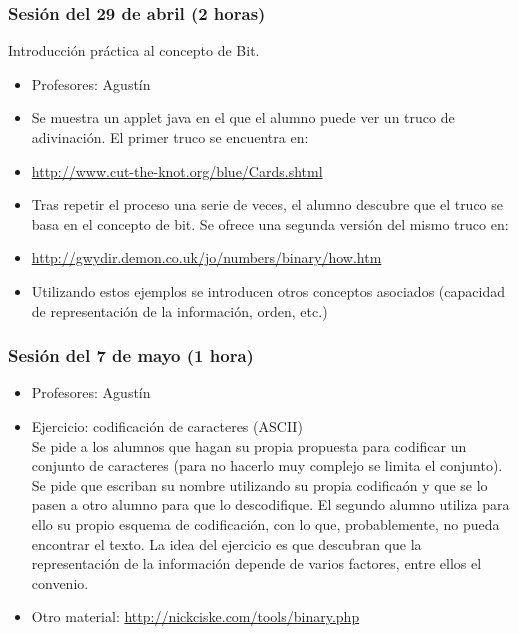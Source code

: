 \documentclass[a4paper,12pt]{article}
\begin{document}
\subsubsection{Sesión del 29 de abril (2 horas)}

Introducción práctica al concepto de Bit.

\begin{itemize}
\item Profesores: Agustín
\item Se muestra un applet java en el que el alumno puede ver un truco de adivinación. El primer truco se encuentra en:
\item \url{http://www.cut-the-knot.org/blue/Cards.shtml}
\item Tras repetir el proceso una serie de veces, el alumno descubre que el truco se basa en el concepto de bit. Se ofrece una segunda versión del mismo truco en:
\item \url{http://gwydir.demon.co.uk/jo/numbers/binary/how.htm}
\item Utilizando estos ejemplos se introducen otros conceptos asociados (capacidad de representación de la información, orden, etc.)
\end{itemize}

\subsubsection{Sesión del 7 de mayo (1 hora)}

\begin{itemize}
\item Profesores: Agustín
\item Ejercicio: codificación de caracteres (ASCII) \\
Se pide a los alumnos que hagan su propia propuesta para codificar un conjunto de caracteres (para no hacerlo muy complejo se limita el conjunto). Se pide que escriban su nombre utilizando su propia codificaón y que se lo pasen a otro alumno para que lo descodifique. El segundo alumno utiliza para ello su propio esquema de codificación, con lo que, probablemente, no pueda encontrar el texto. La idea del ejercicio es que descubran que la representación de la información depende de varios factores, entre ellos el convenio.
\item Otro material: \url{http://nickciske.com/tools/binary.php}
\end{itemize}
\end{document}
